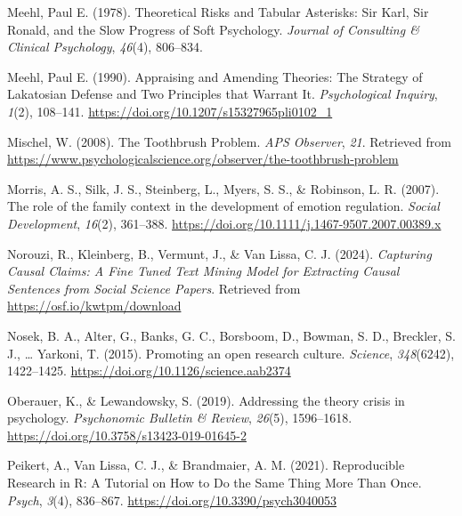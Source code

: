 \documentclass[
  man,floatsintext]{apa6}
\newlength{\cslhangindent}
\newenvironment{CSLReferences}[2] %
 {\begin{list}{}{%
  \setlength{\itemindent}{0pt}
  \setlength{\leftmargin}{0pt}
  \setlength{\parsep}{0pt}
  \ifodd #1
   \setlength{\leftmargin}{\cslhangindent}
   \setlength{\itemindent}{-1\cslhangindent}
  \fi
  \setlength{\itemsep}{#2\baselineskip}}}
 {\end{list}}
\begin{document}
\begin{CSLReferences}{1}{0}
Meehl, Paul E. (1978). Theoretical {Risks} and {Tabular Asterisks}: {Sir Karl}, {Sir Ronald}, and the {Slow Progress} of {Soft Psychology}. \emph{Journal of Consulting \& Clinical Psychology}, \emph{46}(4), 806--834.

Meehl, Paul E. (1990). Appraising and {Amending Theories}: {The Strategy} of {Lakatosian Defense} and {Two Principles} that {Warrant It}. \emph{Psychological Inquiry}, \emph{1}(2), 108--141. \url{https://doi.org/10.1207/s15327965pli0102_1}

Mischel, W. (2008). The {Toothbrush Problem}. \emph{APS Observer}, \emph{21}. Retrieved from \url{https://www.psychologicalscience.org/observer/the-toothbrush-problem}

Morris, A. S., Silk, J. S., Steinberg, L., Myers, S. S., \& Robinson, L. R. (2007). The role of the family context in the development of emotion regulation. \emph{Social Development}, \emph{16}(2), 361--388. \url{https://doi.org/10.1111/j.1467-9507.2007.00389.x}

Norouzi, R., Kleinberg, B., Vermunt, J., \& Van Lissa, C. J. (2024). \emph{Capturing {Causal Claims}: {A Fine Tuned Text Mining Model} for {Extracting Causal Sentences} from {Social Science Papers}}. Retrieved from \url{https://osf.io/kwtpm/download}

Nosek, B. A., Alter, G., Banks, G. C., Borsboom, D., Bowman, S. D., Breckler, S. J., \ldots{} Yarkoni, T. (2015). Promoting an open research culture. \emph{Science}, \emph{348}(6242), 1422--1425. \url{https://doi.org/10.1126/science.aab2374}

Oberauer, K., \& Lewandowsky, S. (2019). Addressing the theory crisis in psychology. \emph{Psychonomic Bulletin \& Review}, \emph{26}(5), 1596--1618. \url{https://doi.org/10.3758/s13423-019-01645-2}

Peikert, A., Van Lissa, C. J., \& Brandmaier, A. M. (2021). Reproducible {Research} in {R}: {A Tutorial} on {How} to {Do} the {Same Thing More Than Once}. \emph{Psych}, \emph{3}(4), 836--867. \url{https://doi.org/10.3390/psych3040053}


\end{CSLReferences}
\end{document}
